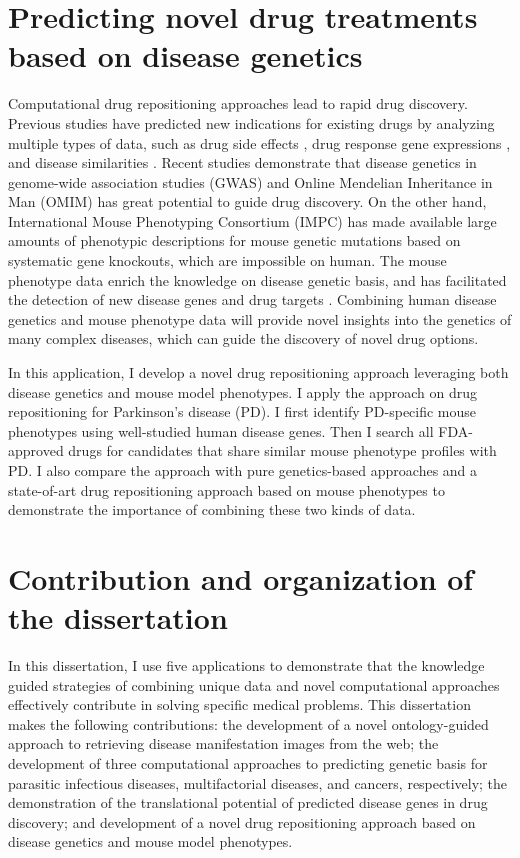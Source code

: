 \section{Predicting novel drug treatments based on disease genetics}
Computational drug repositioning approaches lead to rapid drug discovery.
Previous studies have predicted new indications for existing drugs
by analyzing multiple types of data, such as drug side effects \cite{campillos2008drug},
drug response gene expressions \cite{dudley2011computational},
and disease similarities \cite{gottlieb2011predict}.
Recent studies demonstrate that disease genetics in
genome-wide association studies (GWAS) \cite{sanseau2012use} and
Online Mendelian Inheritance in Man (OMIM) \cite{wang2013rational} has great
potential to guide drug discovery.
On the other hand, International Mouse Phenotyping Consortium (IMPC) \cite{brown2012towards}
has made available large amounts of phenotypic descriptions for mouse genetic mutations
based on systematic gene knockouts, which are impossible on human.
The mouse phenotype data enrich the knowledge on disease genetic basis,
and has facilitated the detection of new disease genes \cite{hoehndorf2011phenomenet}
and drug targets \cite{hoehndorf2014mouse}.
Combining human disease genetics and mouse phenotype data will provide novel
insights into the genetics of many complex diseases, which can guide the discovery
of novel drug options.

In this application, I develop a novel drug repositioning approach leveraging
both disease genetics and mouse model phenotypes.
I apply the approach on drug repositioning for Parkinson's disease (PD).
I first identify PD-specific mouse phenotypes using well-studied human disease genes.
Then I search all FDA-approved drugs for candidates that share
similar mouse phenotype profiles with PD.
I also compare the approach with pure genetics-based approaches and a
state-of-art drug repositioning approach based on mouse phenotypes \cite{hoehndorf2012linking}
to demonstrate the importance of combining these two kinds of data.


\section{Contribution and organization of the dissertation}
In this dissertation, I use five applications to demonstrate that the knowledge guided
strategies of combining unique data and novel computational approaches effectively contribute
in solving specific medical problems.
This dissertation makes the following contributions: the development of a novel ontology-guided approach to retrieving
disease manifestation images from the web; the development of three computational approaches to predicting
genetic basis for parasitic infectious diseases, multifactorial diseases, and cancers, respectively;
the demonstration of the translational potential of predicted disease genes in drug discovery;
and development of a novel drug repositioning approach based on disease genetics and mouse model phenotypes.



